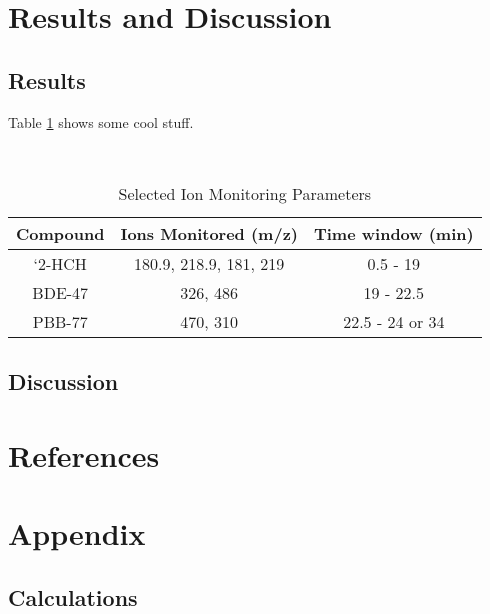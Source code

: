 \documentclass[a4paper, 12pt]{article}
\begin{document}
\section{Results and Discussion}

\subsection{Results}
Table \ref{tab-para} shows some cool stuff.

\begin{table}[h!]
	\centering
	\caption{Selected Ion Monitoring Parameters}
	\hfill \\
	\begin{tabular}{|c|c|c|}
		\hline
		Compound & Ions Monitored (m/z) & Time window (min) \\
		\hline
		`2-HCH & 180.9, 218.9, 181, 219 & 0.5 - 19 \\
		\hline
		BDE-47 & 326, 486 & 19 - 22.5 \\
		\hline
		PBB-77 & 470, 310 & 22.5 - 24 or 34 \\
		\hline
	\end{tabular}
	\label{tab-para}
\end{table}


\subsection{Discussion}



\section{References}
\printbibliography


\section{Appendix}

\subsection{Calculations}
\end{document}
